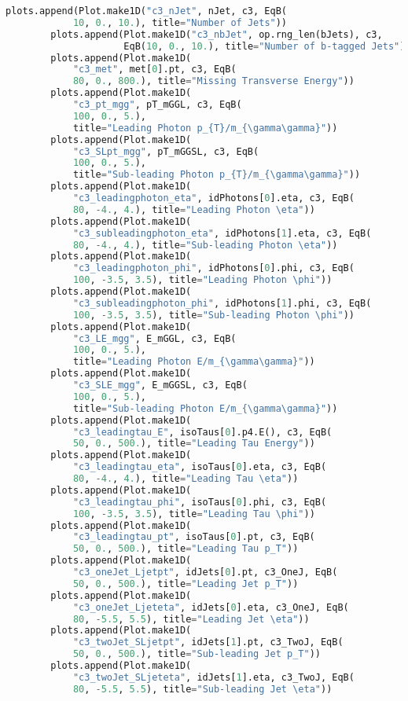 \begin{lstlisting}[language=Python, caption=Python module of the analysis used in Bamboo framework, label={bamboocode}]
        plots.append(Plot.make1D("c3_nJet", nJet, c3, EqB(
            10, 0., 10.), title="Number of Jets"))
        plots.append(Plot.make1D("c3_nbJet", op.rng_len(bJets), c3,
                     EqB(10, 0., 10.), title="Number of b-tagged Jets"))
        plots.append(Plot.make1D(
            "c3_met", met[0].pt, c3, EqB(
            80, 0., 800.), title="Missing Transverse Energy"))
        plots.append(Plot.make1D(
            "c3_pt_mgg", pT_mGGL, c3, EqB(
            100, 0., 5.),
            title="Leading Photon p_{T}/m_{\gamma\gamma}"))
        plots.append(Plot.make1D(
            "c3_SLpt_mgg", pT_mGGSL, c3, EqB(
            100, 0., 5.),
            title="Sub-leading Photon p_{T}/m_{\gamma\gamma}"))
        plots.append(Plot.make1D(
            "c3_leadingphoton_eta", idPhotons[0].eta, c3, EqB(
            80, -4., 4.), title="Leading Photon \eta"))
        plots.append(Plot.make1D(
            "c3_subleadingphoton_eta", idPhotons[1].eta, c3, EqB(
            80, -4., 4.), title="Sub-leading Photon \eta"))
        plots.append(Plot.make1D(
            "c3_leadingphoton_phi", idPhotons[0].phi, c3, EqB(
            100, -3.5, 3.5), title="Leading Photon \phi"))
        plots.append(Plot.make1D(
            "c3_subleadingphoton_phi", idPhotons[1].phi, c3, EqB(
            100, -3.5, 3.5), title="Sub-leading Photon \phi"))
        plots.append(Plot.make1D(
            "c3_LE_mgg", E_mGGL, c3, EqB(
            100, 0., 5.),
            title="Leading Photon E/m_{\gamma\gamma}"))
        plots.append(Plot.make1D(
            "c3_SLE_mgg", E_mGGSL, c3, EqB(
            100, 0., 5.),
            title="Sub-leading Photon E/m_{\gamma\gamma}"))
        plots.append(Plot.make1D(
            "c3_leadingtau_E", isoTaus[0].p4.E(), c3, EqB(
            50, 0., 500.), title="Leading Tau Energy"))
        plots.append(Plot.make1D(
            "c3_leadingtau_eta", isoTaus[0].eta, c3, EqB(
            80, -4., 4.), title="Leading Tau \eta"))
        plots.append(Plot.make1D(
            "c3_leadingtau_phi", isoTaus[0].phi, c3, EqB(
            100, -3.5, 3.5), title="Leading Tau \phi"))
        plots.append(Plot.make1D(
            "c3_leadingtau_pt", isoTaus[0].pt, c3, EqB(
            50, 0., 500.), title="Leading Tau p_T"))
        plots.append(Plot.make1D(
            "c3_oneJet_Ljetpt", idJets[0].pt, c3_OneJ, EqB(
            50, 0., 500.), title="Leading Jet p_T"))
        plots.append(Plot.make1D(
            "c3_oneJet_Ljeteta", idJets[0].eta, c3_OneJ, EqB(
            80, -5.5, 5.5), title="Leading Jet \eta"))
        plots.append(Plot.make1D(
            "c3_twoJet_SLjetpt", idJets[1].pt, c3_TwoJ, EqB(
            50, 0., 500.), title="Sub-leading Jet p_T"))
        plots.append(Plot.make1D(
            "c3_twoJet_SLjeteta", idJets[1].eta, c3_TwoJ, EqB(
            80, -5.5, 5.5), title="Sub-leading Jet \eta"))


\end{lstlisting}
